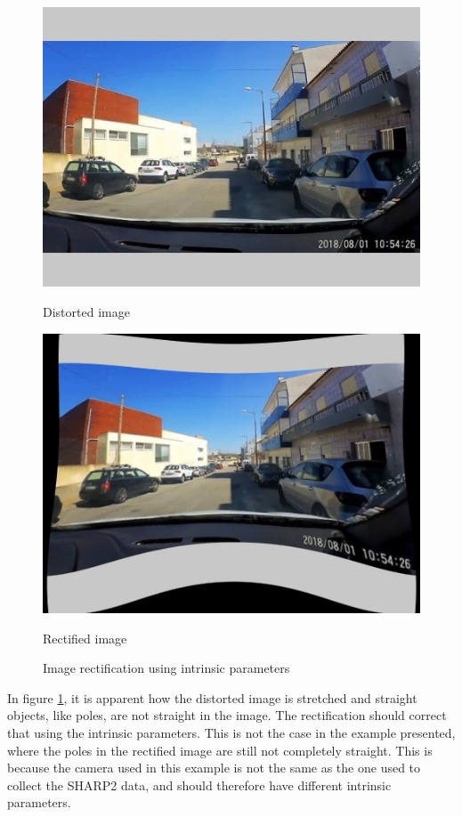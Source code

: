 \begin{figure}[H]
\centering
\begin{minipage}[b]{0.45\linewidth}
    \includegraphics[width=\textwidth]{random_image_extended.jpg}
    \caption*{Distorted image}
\end{minipage}
\begin{minipage}[b]{0.45\linewidth}
    \includegraphics[width = \textwidth]{random_image_rectified.jpg}
    \caption*{Rectified image}
\end{minipage}
\caption{Image rectification using intrinsic parameters}
\label{fig:image_rectification}
\end{figure}

In figure \ref{fig:image_rectification}, it is apparent how the distorted image is stretched and straight objects, like poles, are not straight in the image. The rectification should correct that using the intrinsic parameters. This is not the case in the example presented, where the poles in the rectified image are still not completely straight. This is because the camera used in this example is not the same as the one used to collect the SHARP2 data, and should therefore have different intrinsic parameters.  


